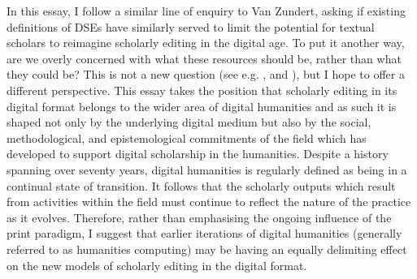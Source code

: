\begin{paper}
In this essay, I follow a similar line of enquiry to Van Zundert, asking if existing definitions of DSEs have similarly served to limit the potential for textual scholars to reimagine scholarly editing in the digital age. To put it another way, are we overly concerned with what these resources should be, rather than what they could be? This is not a new question (see e.g. \citealt{prescott_riffs_2003}, \citealt[106]{robinson_towards_2013} and \citealt[210]{pierazzo_digital_2014}), but I hope to offer a different perspective. This essay takes the position that scholarly editing in its digital format belongs to the wider area of digital humanities and as such it is shaped not only by the underlying digital medium but also by the social, methodological, and epistemological commitments of the field which has developed to support digital scholarship in the humanities. Despite a history spanning over seventy years, digital humanities is regularly defined as being in a continual state of transition. It follows that the scholarly outputs which result from activities within the field must continue to reflect the nature of the practice as it evolves. Therefore, rather than emphasising the ongoing influence of the print paradigm, I suggest that earlier iterations of digital humanities (generally referred to as humanities computing) may be having an equally delimiting effect on the new models of scholarly editing in the digital format. 


\end{paper}
